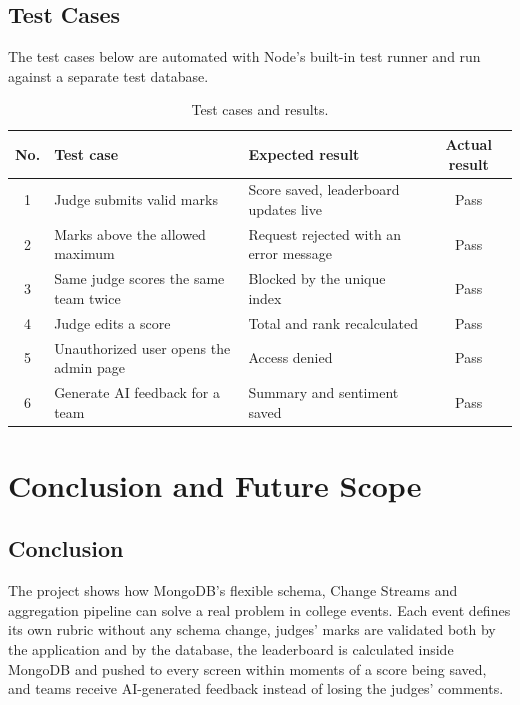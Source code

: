 \documentclass[11pt,a4paper]{article}
\begin{document}
\subsection{Test Cases}
The test cases below are automated with Node's built-in test runner and run against a separate test database.

\begin{table}[H]
\centering
\begin{tabularx}{\textwidth}{c X X c}
\toprule
\textbf{No.} & \textbf{Test case} & \textbf{Expected result} & \textbf{Actual result} \\
\midrule
1 & Judge submits valid marks            & Score saved, leaderboard updates live & Pass \\
2 & Marks above the allowed maximum      & Request rejected with an error message & Pass \\
3 & Same judge scores the same team twice & Blocked by the unique index & Pass \\
4 & Judge edits a score                  & Total and rank recalculated & Pass \\
5 & Unauthorized user opens the admin page & Access denied & Pass \\
6 & Generate AI feedback for a team      & Summary and sentiment saved & Pass \\
\bottomrule
\end{tabularx}
\caption{Test cases and results.}
\end{table}


\section{Conclusion and Future Scope}

\subsection{Conclusion}
The project shows how MongoDB's flexible schema, Change Streams and aggregation pipeline can solve a real problem in college events. Each event defines its own rubric without any schema change, judges' marks are validated both by the application and by the database, the leaderboard is calculated inside MongoDB and pushed to every screen within moments of a score being saved, and teams receive AI-generated feedback instead of losing the judges' comments.
\end{document}
